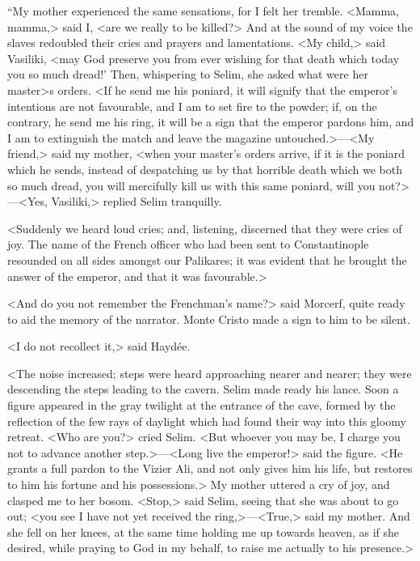  “My mother experienced the same sensations, for I felt her tremble. <Mamma, mamma,> said I, <are we really to be killed?> And at the sound of my voice the slaves redoubled their cries and prayers and lamentations. <My child,> said Vasiliki, <may God preserve you from ever wishing for that death which today you so much dread!' Then, whispering to Selim, she asked what were her master>s orders. <If he send me his poniard, it will signify that the emperor's intentions are not favourable, and I am to set fire to the powder; if, on the contrary, he send me his ring, it will be a sign that the emperor pardons him, and I am to extinguish the match and leave the magazine untouched.>—<My friend,> said my mother, <when your master's orders arrive, if it is the poniard which he sends, instead of despatching us by that horrible death which we both so much dread, you will mercifully kill us with this same poniard, will you not?>—<Yes, Vasiliki,> replied Selim tranquilly. 

 <Suddenly we heard loud cries; and, listening, discerned that they were cries of joy. The name of the French officer who had been sent to Constantinople resounded on all sides amongst our Palikares; it was evident that he brought the answer of the emperor, and that it was favourable.> 

 <And do you not remember the Frenchman's name?> said Morcerf, quite ready to aid the memory of the narrator. Monte Cristo made a sign to him to be silent. 

 <I do not recollect it,> said Haydée. 

 <The noise increased; steps were heard approaching nearer and nearer; they were descending the steps leading to the cavern. Selim made ready his lance. Soon a figure appeared in the gray twilight at the entrance of the cave, formed by the reflection of the few rays of daylight which had found their way into this gloomy retreat. <Who are you?> cried Selim. <But whoever you may be, I charge you not to advance another step.>—<Long live the emperor!> said the figure. <He grants a full pardon to the Vizier Ali, and not only gives him his life, but restores to him his fortune and his possessions.> My mother uttered a cry of joy, and clasped me to her bosom. <Stop,> said Selim, seeing that she was about to go out; <you see I have not yet received the ring,>—<True,> said my mother. And she fell on her knees, at the same time holding me up towards heaven, as if she desired, while praying to God in my behalf, to raise me actually to his presence.> 

